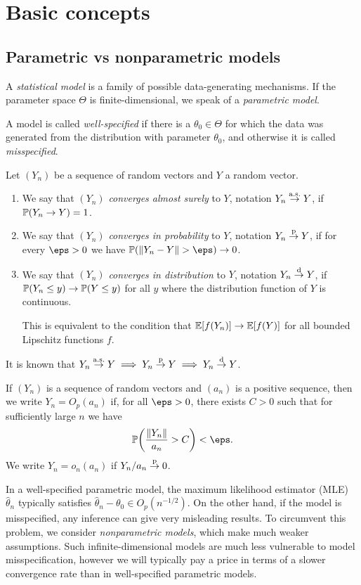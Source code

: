\section{Basic concepts}
\subsection{Parametric vs nonparametric models}
\begin{definition}
    A \emph{statistical model} is a family of possible data-generating mechanisms. If the parameter space $\Theta$ is finite-dimensional, we speak of a \emph{parametric model}. 
    
    A model is called \emph{well-specified} if there is a $\theta_0 \in \Theta$ for which the data was generated from the distribution with parameter $\theta_0$, and otherwise it is called \emph{misspecified}. 
\end{definition}

\begin{recap}
    Let $(Y_n)$ be a sequence of random vectors and $Y$ a random vector. 
    \begin{enumerate}
        \item We say that $(Y_n)$ \emph{converges almost surely} to $Y$, notation $Y_n \overset{\mathrm{a.s.}}{\to} Y$, if $\mathbb P(Y_n \to Y) = 1$. 
        \item We say that $(Y_n)$ \emph{converges in probability} to $Y$, notation $Y_n \overset{\mathrm{p}}{\to} Y$, if for every $\eps > 0$ we have $\PP(\norm{Y_n - Y} > \eps) \to 0$.
        \item We say that  $(Y_n)$ \emph{converges in distribution} to $Y$, notation $Y_n \overset{\mathrm{d}}{\to} Y$, if $\mathbb P(Y_n \leq y) \to \mathbb P(Y \leq y)$ for all $y$ where the distribution function of $Y$ is continuous. 
        
        This is equivalent to the condition that $\mathbb E[f(Y_n)] \to \mathbb E[f(Y)]$ for all bounded Lipschitz functions $f$. 
    \end{enumerate}
    It is known that $Y_n \overset{\mathrm{a.s.}}{\to} Y \implies Y_n \overset{\mathrm{p}}{\to} Y \implies Y_n \overset{\mathrm{d}}{\to} Y$. 
    
    If $(Y_n)$ is a sequence of random vectors and $(a_n)$ is a positive sequence, then we write $Y_n = O_p(a_n)$ if, for all $\eps > 0$, there exists $C > 0$ such that for sufficiently large $n$ we have
    \[
    \PP\qty(\frac{\norm{Y_n}}{a_n} > C) < \eps. 
    \]
    We write $Y_n = o_n(a_n)$ if $Y_n/a_n \overset{\mathrm{p}}{\to} 0$. 
\end{recap}
In a well-specified parametric model, the maximum likelihood estimator (MLE) $\hat\theta_n$ typically satisfies $\hat\theta_n - \theta_0 \in O_p(n^{-1/2})$. On the other hand, if the model is misspecified, any inference can give very misleading results. To circumvent this problem, we consider \emph{nonparametric models}, which make much weaker assumptions. Such infinite-dimensional models are much less vulnerable to model misspecification, however we will typically pay a price in terms of a slower convergence rate than in well-specified parametric models. 


